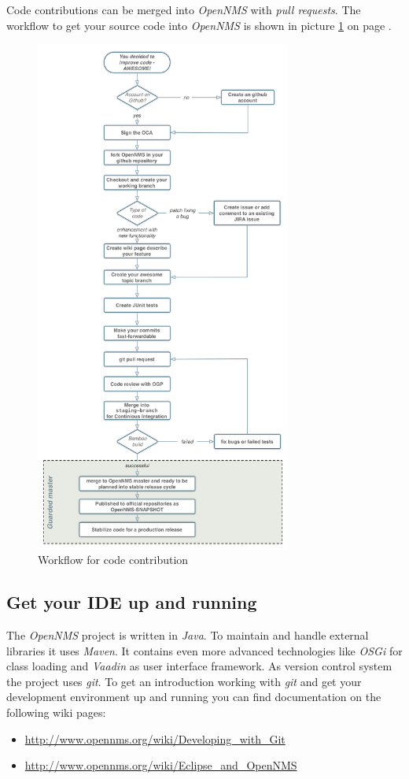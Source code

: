 Code contributions can be merged into \emph{OpenNMS} with \emph{pull requests}. The workflow to get your source code into \emph{OpenNMS} is shown in picture \ref{fig:contrib-workflow} on page \pageref{fig:contrib-workflow}.
\begin{figure}
	\centering
	\includegraphics[width=0.75\textwidth]{images/contribution-workflow.png}
	\caption{Workflow for code contribution}
	\label{fig:contrib-workflow}
\end{figure}

\subsection*{Get your IDE up and running}
The \emph{OpenNMS} project is written in \emph{Java}. To maintain and handle external libraries it uses \emph{Maven}. It contains even more advanced technologies like \emph{OSGi} for class loading and \emph{Vaadin} as user interface framework. As version control system the project uses \emph{git}. To get an introduction working with \emph{git} and get your development environment up and running you can find documentation on the following wiki pages:
\begin{itemize}
  \item \url{http://www.opennms.org/wiki/Developing_with_Git}
  \item \url{http://www.opennms.org/wiki/Eclipse_and_OpenNMS}
\end{itemize}

